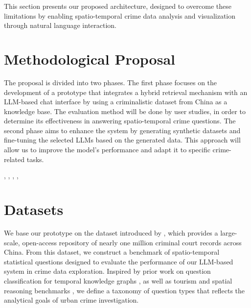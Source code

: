 This section presents our proposed architecture, designed to overcome these limitations by enabling spatio-temporal crime data analysis and visualization through natural language interaction.



\section{Methodological Proposal}

The proposal is divided into two phases. The first phase focuses on the development of a prototype that integrates a hybrid retrieval mechanism with an LLM-based chat interface by using a criminalistic dataset from China as a knowledge base. The evaluation method will be done by user studies, in order to determine its effectiveness in answering spatio-temporal crime questions. The second phase aims to enhance the system by generating synthetic datasets and fine-tuning the selected LLMs based on the generated data. This approach will allow us to improve the model's performance and adapt it to specific crime-related tasks.

\cite{Moshkov2025AIMO2}, \cite{Fleureau2024NuminaMath}, \cite{Jain2024MetaFineTuning}, \cite{Wang2023SelfConsistency}, \cite{Ahmad2025OCRNVidia}

\section{Datasets}


We base our prototype on the dataset introduced by \cite{Zhang2025CrimeDatasetChina}, which provides a large-scale, open-access repository of nearly one million criminal court records across China. From this dataset, we construct a benchmark of spatio-temporal statistical questions designed to evaluate the performance of our LLM-based system in crime data exploration. Inspired by prior work on question classification for temporal knowledge graphs \cite{Saxena2021TemporalKGQA}, as well as tourism and spatial reasoning benchmarks \cite{Contractor2020QATourism, Dai2024QASTKG}, we define a taxonomy of question types that reflects the analytical goals of urban crime investigation.

